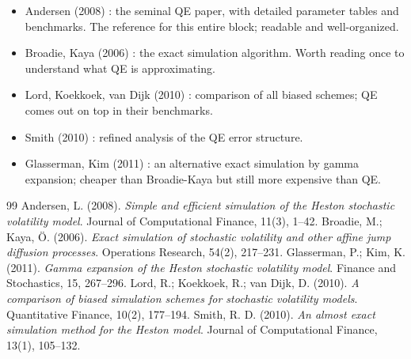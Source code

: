 \documentclass[11pt]{article}
\theoremstyle{plain}
\theoremstyle{definition}
\theoremstyle{remark}
\begin{document}
\begin{itemize}[topsep=2pt]
    \item Andersen (2008) \cite{Andersen2008}: the seminal QE paper, with detailed parameter tables and benchmarks. The reference for this entire block; readable and well-organized.
    \item Broadie, Kaya (2006) \cite{BroadieKaya2006}: the exact simulation algorithm. Worth reading once to understand what QE is approximating.
    \item Lord, Koekkoek, van Dijk (2010) \cite{LKvD2010}: comparison of all biased schemes; QE comes out on top in their benchmarks.
    \item Smith (2010) \cite{Smith2010}: refined analysis of the QE error structure.
    \item Glasserman, Kim (2011) \cite{GlassermanKim2011}: an alternative exact simulation by gamma expansion; cheaper than Broadie-Kaya but still more expensive than QE.
\end{itemize}

\begin{thebibliography}{99}
                Andersen, L. (2008). \emph{Simple and efficient simulation of the Heston stochastic volatility model}. Journal of Computational Finance, 11(3), 1--42.
             Broadie, M.; Kaya, \"O. (2006). \emph{Exact simulation of stochastic volatility and other affine jump diffusion processes}. Operations Research, 54(2), 217--231.
           Glasserman, P.; Kim, K. (2011). \emph{Gamma expansion of the Heston stochastic volatility model}. Finance and Stochastics, 15, 267--296.
                    Lord, R.; Koekkoek, R.; van Dijk, D. (2010). \emph{A comparison of biased simulation schemes for stochastic volatility models}. Quantitative Finance, 10(2), 177--194.
                   Smith, R. D. (2010). \emph{An almost exact simulation method for the Heston model}. Journal of Computational Finance, 13(1), 105--132.
\end{thebibliography}
\end{document}
